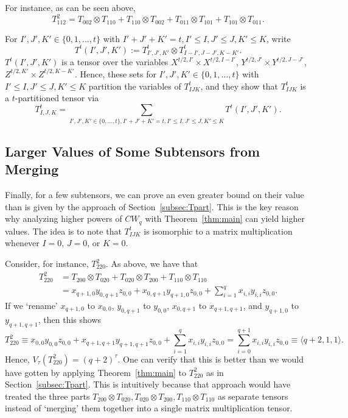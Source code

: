 \PassOptionsToPackage{shortlabels}{enumitem}\documentclass[10pt,a4paper]{article}
\begin{document}
For instance, as can be seen above, $$T^2_{112}=T_{002}\otimes T_{110} + T_{110}\otimes T_{002} + T_{011}\otimes T_{101} + T_{101}\otimes T_{011}.$$

For $I',J',K' \in \{0,1,\ldots,t\}$ with $I'+J'+K'=t, I'\leq I,J'\leq J, K'\leq K$, write $$T^{t}(I',J',K'):=T^t_{I',J',K'}\otimes T^t_{I-I',J-J',K-K'}.$$
$T^{t}(I',J',K')$ is a tensor over the variables $X^{t/2,I'} \times X^{t/2,I-I'}$, $Y^{t/2,J'} \times Y^{t/2,J-J'}$, $Z^{t/2,K'} \times Z^{t/2,K-K'}$. Hence, these sets for $I',J',K' \in \{0,1,\ldots,t\}$ with $I'\leq I,J'\leq J, K'\leq K$ partition the variables of $T^{t}_{IJK}$, and they show that $T^{t}_{IJK}$ is a $t$-partitioned tensor via
$$T^{t}_{I,J,K} = \sum_{I',J',K'\in \{0,\ldots,t\}, I'+J'+K'=t, I'\leq I,J'\leq J, K'\leq K} T^{t}(I',J',K').$$

\subsection{Larger Values of Some Subtensors from Merging}

Finally, for a few subtensors, we can prove an even greater bound on their value than is given by the approach of Section~\ref{subsec:Tpart}. This is the key reason why analyzing higher powers of $CW_q$ with Theorem~\ref{thm:main} can yield higher values. The idea is to note that $T^t_{IJK}$ is isomorphic to a matrix multiplication whenever $I=0$, $J=0$, or $K=0$. 

Consider, for instance, $T^2_{220}$. As above, we have that
\begin{align*}
    T^2_{220} &= T_{200} \otimes T_{020} + T_{020} \otimes T_{200} + T_{110} \otimes T_{110} \\
    &= x_{q+1,0} y_{0,q+1} z_{0,0} + x_{0,q+1} y_{q+1,0} z_{0,0} + \sum_{i=1}^q x_{i,i} y_{i,i} z_{0,0}.
\end{align*}
If we `rename' $x_{q+1,0}$ to $x_{0,0}$, $y_{0,q+1}$ to $y_{0,0}$, $x_{0,q+1}$ to $x_{q+1,q+1}$, and $y_{q+1,0}$ to $y_{q+1,q+1}$, then this shows $$T^2_{220} \equiv x_{0,0} y_{0,0} z_{0,0} + x_{q+1,q+1} y_{q+1,q+1} z_{0,0} + \sum_{i=1}^q x_{i,i} y_{i,i} z_{0,0} = \sum_{i=0}^{q+1} x_{i,i} y_{i,i} z_{0,0} \equiv \langle q+2,1,1 \rangle.$$
Hence, $V_\tau(T^2_{220}) = (q+2)^\tau$. One can verify that this is better than we would have gotten by applying Theorem~\ref{thm:main} to $T^2_{220}$ as in Section~\ref{subsec:Tpart}. This is intuitively because that approach would have treated the three parts  $T_{200} \otimes T_{020}, T_{020} \otimes T_{200}, T_{110} \otimes T_{110}$ as separate tensors instead of `merging' them together into a single matrix multiplication tensor.
\end{document}
